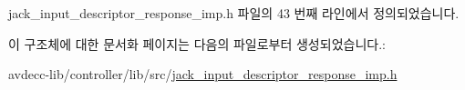 jack\+\_\+input\+\_\+descriptor\+\_\+response\+\_\+imp.\+h 파일의 43 번째 라인에서 정의되었습니다.



이 구조체에 대한 문서화 페이지는 다음의 파일로부터 생성되었습니다.\+:\begin{DoxyCompactItemize}
\item 
avdecc-\/lib/controller/lib/src/\hyperlink{jack__input__descriptor__response__imp_8h}{jack\+\_\+input\+\_\+descriptor\+\_\+response\+\_\+imp.\+h}\end{DoxyCompactItemize}
